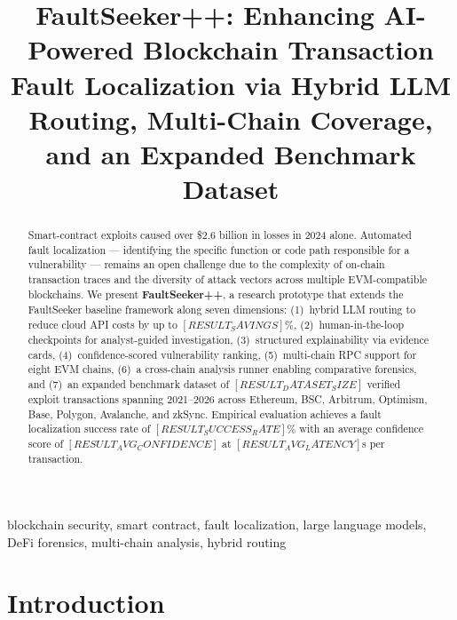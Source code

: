 \documentclass[conference]{IEEEtran}
\begin{document}
\title{FaultSeeker++: Enhancing AI-Powered Blockchain Transaction Fault
Localization via Hybrid LLM Routing, Multi-Chain Coverage, and
an Expanded Benchmark Dataset}

\author{
  \IEEEauthorblockN{[Author 1], [Author 2]}
}

\maketitle

\begin{abstract}
Smart-contract exploits caused over \$2.6 billion in losses in 2024 alone.
Automated fault localization — identifying the specific function or code
path responsible for a vulnerability — remains an open challenge due to
the complexity of on-chain transaction traces and the diversity of attack
vectors across multiple EVM-compatible blockchains.
We present \textbf{FaultSeeker++}, a research prototype that extends the
FaultSeeker baseline framework along seven dimensions:
(1)~hybrid LLM routing to reduce cloud API costs by up to $[RESULT_SAVINGS]\%$,
(2)~human-in-the-loop checkpoints for analyst-guided investigation,
(3)~structured explainability via evidence cards,
(4)~confidence-scored vulnerability ranking,
(5)~multi-chain RPC support for eight EVM chains,
(6)~a cross-chain analysis runner enabling comparative forensics, and
(7)~an expanded benchmark dataset of $[RESULT_DATASET_SIZE]$ verified
exploit transactions spanning 2021–2026 across Ethereum, BSC,
Arbitrum, Optimism, Base, Polygon, Avalanche, and zkSync.
Empirical evaluation achieves a fault localization success rate of
$[RESULT_SUCCESS_RATE]\%$ with an average confidence score of
$[RESULT_AVG_CONFIDENCE]$ at $[RESULT_AVG_LATENCY]$s per transaction.
\end{abstract}

\begin{IEEEkeywords}
blockchain security, smart contract, fault localization, large language
models, DeFi forensics, multi-chain analysis, hybrid routing
\end{IEEEkeywords}


\section{Introduction}
\label{sec:intro}
\end{document}

